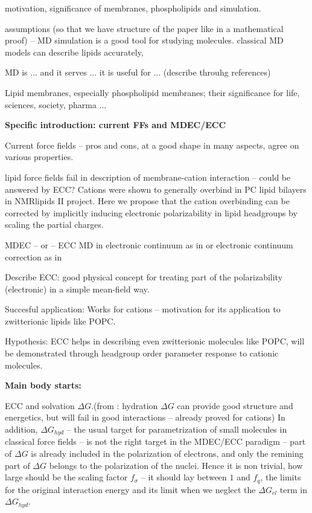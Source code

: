 \documentclass[aip,jcp]{revtex4}
\begin{document}
 motivation, significance of membranes, phospholipids and simulation.

 assumptions (so that we have structure of the paper like in a mathematical proof) -- 
 MD simulation is a good tool for studying molecules.
 classical MD models can describe lipids accurately, 

 MD is ... and it serves ... it is useful for ... (describe throuhg references)

 Lipid membranes, especially phospholipid membranes; their significance for life, sciences, society, pharma ...

\textbf{Specific introduction: current FFs and MDEC/ECC}

 Current force fields -- pros and cons, at a good shape in many aspects, agree on various properties. 

 lipid force fields fail in description of membrane-cation interaction -- could be answered by ECC? 
Cations were shown to generally overbind in PC lipid bilayers in
NMRlipids II project. Here we propose that the cation overbinding can
be corrected by implicitly inducing electronic polarizability in
lipid headgroups by scaling the partial charges.

MDEC -- or -- ECC 
MD in electronic continuum as in \cite{Leontyev2015} or electronic continuum correction as in \cite{Jungwirth2015}

Describe ECC: good physical concept for treating part of the polarizability (electronic) in a simple mean-field way.

Succesful application: Works for cations \cite{Jungwirth2015,Kohagen..} -- motivation for its application to zwitterionic lipids like POPC.

Hypothesis: ECC helps in describing even zwitterionic molecules like POPC, will be demonstrated through headgroup order parameter response to cationic molecules.

\textbf{Main body starts:}

ECC and solvation $\Delta G$.(from \cite{Leontyev2015}: hydration $\Delta G$ can provide good structure and energetics, but will fail in good interactions -- already proved for cations)
In addition, $\Delta G_{hyd}$ -- the usual target for parametrization of small molecules in classical force fields -- is not the right target in the MDEC/ECC paradigm -- part of $\Delta G$ is already included in the polarization of electrons, and only the remining part of $\Delta G$ belongs to the polarization of the nuclei. 
Hence it is non trivial, how large should be the scaling factor $f_\sigma$ -- it should lay between $1$ and $f_q$, the limits for the original interaction energy and its limit when we neglect the $\Delta G_{el}$ term in $\Delta G_{hyd}$. 
\end{document}
